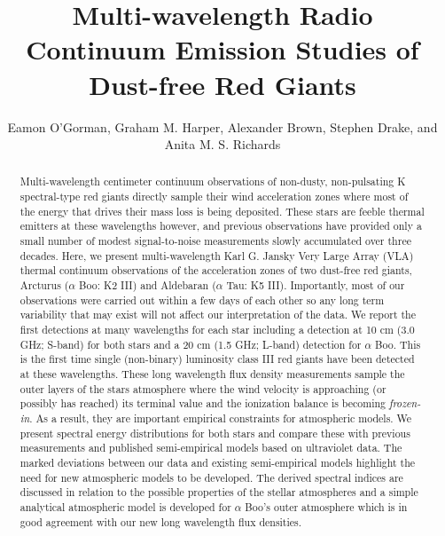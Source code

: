 \documentclass[iop]{emulateapj}
\begin{document}
\title{Multi-wavelength Radio Continuum Emission Studies of Dust-free Red Giants}


\author{Eamon O'Gorman, Graham M. Harper, Alexander Brown, Stephen Drake, and Anita M. S. Richards}


\begin{abstract}

Multi-wavelength centimeter continuum observations of non-dusty, non-pulsating K spectral-type red giants directly sample their wind acceleration zones where most of the energy that drives their mass loss is being deposited. These stars are feeble thermal emitters at these wavelengths however, and previous observations have provided only a small number of modest signal-to-noise measurements slowly accumulated over three decades. Here, we present multi-wavelength Karl G. Jansky Very Large Array (VLA) thermal continuum observations of the acceleration zones of two dust-free red giants, Arcturus ($\alpha$ Boo: K2 III) and Aldebaran ($\alpha$ Tau: K5 III). Importantly, most of our observations were carried out within a few days of each other so any long term variability that may exist will not affect our interpretation of the data. We report the first detections at many wavelengths for each star including a detection at 10 cm (3.0 GHz; S-band) for both stars and a 20 cm (1.5 GHz; L-band) detection for $\alpha$ Boo. This is the first time single (non-binary) luminosity class III red giants have been detected at these wavelengths. These long wavelength flux density measurements sample the outer layers of the stars atmosphere where the wind velocity is approaching (or possibly has reached) its terminal value and the ionization balance is becoming \textit{frozen-in}. As a result, they are important empirical constraints for atmospheric models. We present spectral energy distributions for both stars and compare these with previous measurements and published semi-empirical models based on ultraviolet data. The marked deviations between our data and existing semi-empirical models highlight the need for new atmospheric models to be developed. The derived spectral indices are discussed in relation to the possible properties of the stellar atmospheres and a simple analytical atmospheric model is developed for $\alpha$ Boo's outer atmosphere which is in good agreement with our new long wavelength flux densities.

\end{abstract}
\end{document}
